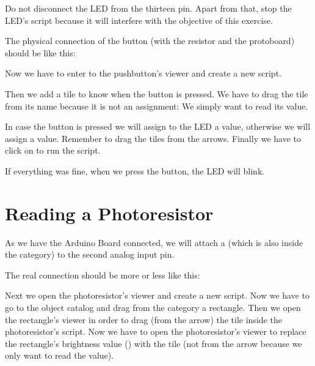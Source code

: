 \documentclass[english]{etoys-guide}
\begin{document}

Do not disconnect the LED from the thirteen pin. Apart from
that, stop the LED's script because it will interfere with the objective of
this exercise.

The physical connection of the button (with the resistor and the protoboard)
should be like this:



Now we have to enter to the pushbutton’s viewer and create a new script. 


Then we add a \testtile{} tile to know when the button is pressed. We have to
drag the tile from its name because it is not an assignment: We simply want to
read its value. 


In case the button is pressed we will assign to the LED a  value,
otherwise we will assign a  value. Remember to drag the tiles from the
 arrows. Finally we have to click on 
to run the script. 


If everything was fine, when we press the button, the LED will blink. 

\section{Reading a Photoresistor}

As we have the Arduino Board connected, we will attach a
 (which is also inside the 
category) to the second analog input pin.


The real connection should be more or less like this:



Next we open the photoresistor’s viewer and create a new script. Now we have to
go to the object catalog and drag from the  category a
rectangle. Then we open the rectangle’s viewer in order to drag (from the
 arrow) the  tile inside the photoresistor’s
script. Now we have to open the photoresistor’s viewer to replace the
rectangle’s brightness value () with the  tile (not from the arrow because we only want to read the value). 
\end{document}
